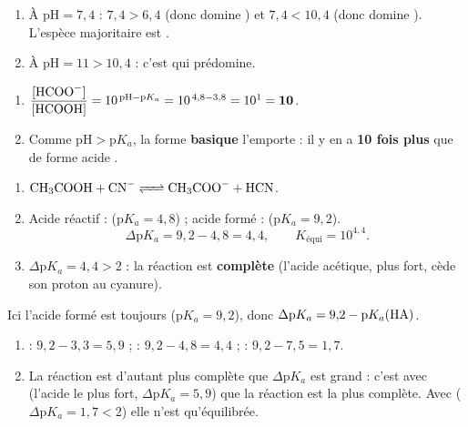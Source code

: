 \documentclass[11pt,a4paper]{article}
\begin{document}

\begin{corrige}
\begin{enumerate}[label=\alph*)]
  \item À $\mathrm{pH} = 7{,}4$ : $7{,}4 > 6{,}4$ (donc  domine ) et $7{,}4 < 10{,}4$ (donc
         domine ). L'espèce majoritaire est \textbf{}.
  \item À $\mathrm{pH} = 11 > 10{,}4$ : c'est \textbf{} qui prédomine.
\end{enumerate}
\end{corrige}

\begin{corrige}
\begin{enumerate}[label=\alph*)]
  \item $\dfrac{[\ce{HCOO-}]}{[\ce{HCOOH}]} = 10^{\,\mathrm{pH}-\mathrm{p}K_a} = 10^{\,4{,}8-3{,}8} = 10^{1} = \mathbf{10}$.
  \item Comme $\mathrm{pH} > \mathrm{p}K_a$, la forme \textbf{basique}  l'emporte : il y en a \textbf{10
        fois plus} que de forme acide .
\end{enumerate}
\end{corrige}

\begin{corrige}
\begin{enumerate}[label=\alph*)]
  \item $\ce{CH3COOH + CN- <=> CH3COO- + HCN}$.
  \item Acide réactif :  ($\mathrm{p}K_a = 4{,}8$) ; acide formé :  ($\mathrm{p}K_a = 9{,}2$).
        \[ \Delta\mathrm{p}K_a = 9{,}2 - 4{,}8 = 4{,}4,\qquad K_{\text{équi}} = 10^{4{,}4}. \]
  \item $\Delta\mathrm{p}K_a = 4{,}4 > 2$ : la réaction est \textbf{complète} (l'acide acétique, plus fort,
        cède son proton au cyanure).
\end{enumerate}
\end{corrige}

\begin{corrige}
Ici l'acide formé est toujours  ($\mathrm{p}K_a = 9{,}2$), donc $\Delta\mathrm{p}K_a = 9{,}2 - \mathrm{p}K_a(\ce{HA})$.
\begin{enumerate}[label=\alph*)]
  \item {} : $9{,}2 - 3{,}3 = 5{,}9$ ;\quad {} : $9{,}2 - 4{,}8 = 4{,}4$ ;\quad
         : $9{,}2 - 7{,}5 = 1{,}7$.
  \item La réaction est d'autant plus complète que $\Delta\mathrm{p}K_a$ est grand : c'est avec \textbf{}
        (l'acide le plus fort, $\Delta\mathrm{p}K_a = 5{,}9$) que la réaction est la plus complète. Avec 
        ($\Delta\mathrm{p}K_a = 1{,}7 < 2$) elle n'est qu'équilibrée.
\end{enumerate}
\end{corrige}
\end{document}
